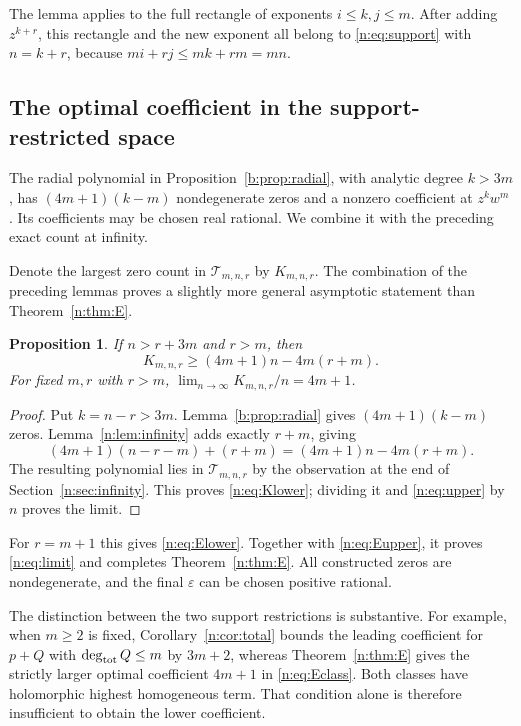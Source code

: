 \documentclass[UTF8,11pt]{ctexart}
\newtheorem{prop}[thm]{Proposition}
\theoremstyle{definition}
\numberwithin{equation}{section}
\newcommand{\Tcal}{\mathcal T}\newcommand{\Ccal}{\mathcal C}
\begin{document}
The lemma applies to the full rectangle of exponents $i\le k,j\le m$.
After adding $z^{k+r}$, this rectangle and the new exponent all belong to
\eqref{n:eq:support} with $n=k+r$, because $mi+rj\le mk+rm=mn$.


\subsection{The optimal coefficient in the support-restricted space}\label{n:sec:construction}
The radial polynomial in Proposition~\ref{b:prop:radial}, with analytic
degree $k>3m$, has $(4m+1)(k-m)$ nondegenerate zeros and a nonzero
coefficient at $z^kw^m$. Its coefficients may be chosen real rational.
We combine it with the preceding exact count at infinity.

Denote the largest zero count in $\Tcal_{m,n,r}$ by $K_{m,n,r}$.
The combination of the preceding lemmas proves a slightly more general
asymptotic statement than Theorem~\ref{n:thm:E}.
\begin{prop}\label{n:prop:lower}
If $n>r+3m$ and $r>m$, then
\begin{equation}\label{n:eq:Klower}
 K_{m,n,r}\ge(4m+1)n-4m(r+m).
\end{equation}
For fixed $m,r$ with $r>m$, $\lim_{n\to\infty}K_{m,n,r}/n=4m+1$.
\end{prop}
\begin{proof}
Put $k=n-r>3m$. Lemma~\ref{b:prop:radial} gives $(4m+1)(k-m)$ zeros.
Lemma~\ref{n:lem:infinity} adds exactly $r+m$, giving
\[
 (4m+1)(n-r-m)+(r+m)=(4m+1)n-4m(r+m).
\]
The resulting polynomial lies in $\Tcal_{m,n,r}$ by the observation at the
end of Section~\ref{n:sec:infinity}. This proves \eqref{n:eq:Klower}; dividing
it and \eqref{n:eq:upper} by $n$ proves the limit.
\end{proof}

For $r=m+1$ this gives \eqref{n:eq:Elower}. Together with
\eqref{n:eq:Eupper}, it proves \eqref{n:eq:limit} and completes
Theorem~\ref{n:thm:E}. All constructed zeros are nondegenerate, and the final
$\varepsilon$ can be chosen positive rational.

The distinction between the two support restrictions is substantive.
For example, when $m\ge2$ is fixed, Corollary~\ref{n:cor:total} bounds the
leading coefficient for $p+Q$ with $\deg_{\rm tot}Q\le m$ by $3m+2$,
whereas Theorem~\ref{n:thm:E} gives the strictly larger optimal coefficient
$4m+1$ in \eqref{n:eq:Eclass}. Both classes have holomorphic highest
homogeneous term. That condition alone is therefore insufficient to
obtain the lower coefficient.
\end{document}
